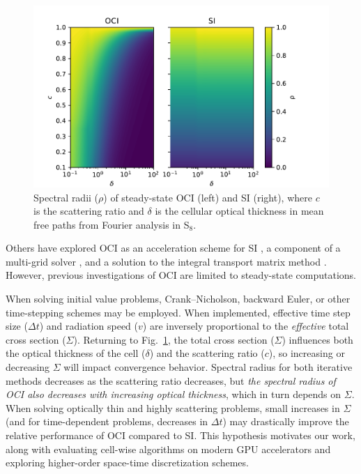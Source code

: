 \begin{figure}[htbp]
    \centering
    \includegraphics[width=\textwidth]{manuscript2/man2_figs/ss_specrads.pdf}
    \caption{Spectral radii (${\rho}$) of steady-state OCI (left) and SI (right), where $c$ is the scattering ratio and ${\delta}$ is the cellular optical thickness in mean free paths from Fourier analysis in S$_8$.}
    \label{fig:ss-sepcrad}
\end{figure}

Others have explored OCI as an acceleration scheme for SI \cite{ hoagland_hybrid_2021}, a component of a multi-grid solver \cite{man1995multigrid1, man1996multigrid2}, and a solution to the integral transport matrix method \cite{raffi2108pidotscom}.
However, previous investigations of OCI are limited to steady-state computations.

When solving initial value problems, Crank--Nicholson, backward Euler, or other time-stepping schemes may be employed.
When implemented, effective time step size ($\Delta t$) and radiation speed ($v$) are inversely proportional to the \textit{effective} total cross section ($\Sigma$).
Returning to Fig.~\ref{fig:ss-sepcrad}, the total cross section ($\Sigma$) influences both the optical thickness of the cell ($\delta$) and the scattering ratio ($c$), so increasing or decreasing $\Sigma$ will impact convergence behavior.
Spectral radius for both iterative methods decreases as the scattering ratio decreases, but \textit{the spectral radius of OCI also decreases with increasing optical thickness}, which in turn depends on $\Sigma$.
When solving optically thin and highly scattering problems, small increases in $\Sigma$ (and for time-dependent problems, decreases in $\Delta t$) may drastically improve the relative performance of OCI compared to SI.
This hypothesis motivates our work, along with evaluating cell-wise algorithms on modern GPU accelerators and exploring higher-order space-time discretization schemes.

